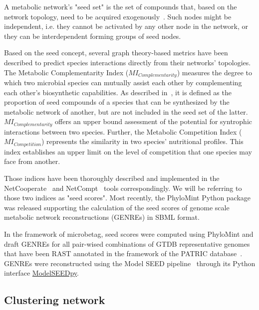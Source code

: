 \documentclass[sn-mathphys,Numbered, lineno]{sn-jnl}  %
\theoremstyle{thmstyleone}%
\theoremstyle{thmstyletwo}%
\theoremstyle{thmstylethree}%
\begin{document}
        A metabolic network’s "seed set" is the set of compounds that, based on the network topology, need to be acquired exogenously~\cite{borenstein2008large}.
        Such nodes might be independent, i.e. they cannot be activated by any other node in the network, or they can be interdependent forming groups of seed nodes.

        
        Based on the seed concept, several graph theory-based metrics have been described to predict species interactions directly from their networks' topologies.
        The Metabolic Complementarity Index ($MI_{Complementarity}$) measures the degree to which two microbial species can mutually assist each other by complementing each other's biosynthetic capabilities.
        As described in~\cite{phylomint_ms}, it is defined as the proportion of seed compounds of a species that can be synthesized by the metabolic network of another, but are not included in the seed set of the latter. 
        $MI_{Complementarity}$ offers an upper bound assessment of the potential for syntrophic interactions between two species.        
        Further, the Metabolic Competition Index ($MI_{Competition}$) represents the similarity in two species’ nutritional profiles. 
        This index establishes an upper limit on the level of competition that one species may face from another.

        Those indices have been thoroughly described and implemented in the NetCooperate~\cite{levy2015netcooperate} and NetCompt~\cite{kreimer2012netcmpt} tools correspondingly.
        We will be referring to those two indices as "seed scores". 
        Most recently, the PhyloMint Python package~\cite{phylomint_ms} was released supporting the calculation of the seed scores of genome scale metabolic network reconstructions (GENREs) in SBML format.

        In the framework of microbetag, seed scores were computed using PhyloMint and draft GENREs for all pair-wised combinations of GTDB representative genomes that have been RAST annotated in the framework of the PATRIC database~\cite{wattam2017improvements}.
        GENREs were reconstructed using the Model SEED pipeline~\cite{henry2010high} through its Python interface \href{https://modelseedpy.readthedocs.io/en/latest/index.html}{ModelSEEDpy}.
        
        




    \subsection*{ Clustering network  }
    \label{subsec:mant}
\end{document}
